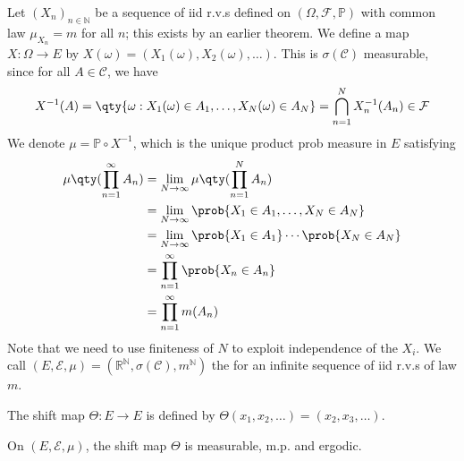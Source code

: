 Let $(X_n)_{n \in \mathbb N}$ be a sequence of iid r.v.s defined on $(\Omega, \mathcal F, \mathbb P)$ with common law $\mu_{X_n} = m$ for all $n$; this exists by an earlier theorem.
We define a map $X \colon \Omega \to E$ by $X(\omega) = (X_1(\omega), X_2(\omega), \dots)$.
This is $\sigma(\mathcal C)$ measurable, since for all $A \in \mathcal C$, we have
\begin{align*}
        X^{-1}(A) = \qty{\omega : X_1(\omega) \in A_1, \dots, X_N(\omega) \in A_N} = \bigcap_{n=1}^N X_n^{-1}(A_n) \in \mathcal F
    \end{align*}
We denote $\mu = \mathbb P \circ X^{-1}$, which is the unique product prob measure in $E$ satisfying
\begin{align*}
		\mu\qty(\prod_{n=1}^\infty A_n) &= \lim_{N \to \infty} \mu\qty(\prod_{n=1}^N A_n) \\
		&= \lim_{N \to \infty} \prob{X_1 \in A_1, \dots, X_N \in A_N} \\
		&= \lim_{N \to \infty} \prob{X_1 \in A_1} \cdots \prob{X_N \in A_N} \\
		&= \prod_{n=1}^\infty \prob{X_n \in A_n} \\
		&= \prod_{n=1}^\infty m(A_n)
\end{align*}
Note that we need to use finiteness of $N$ to exploit independence of the $X_i$.
We call $(E, \mathcal E, \mu) = (\mathbb R^{\mathbb N}, \sigma(\mathcal C), m^{\mathbb N})$ the  for an infinite sequence of iid r.v.s of law $m$.

\begin{definition}
	The shift map $\Theta \colon E \to E$ is defined by $\Theta(x_1, x_2, \dots) = (x_2, x_3, \dots)$.
\end{definition}

\begin{theorem}
	On $(E, \mathcal{E}, \mu)$, the shift map $\Theta$ is measurable, m.p. and ergodic.
\end{theorem}

